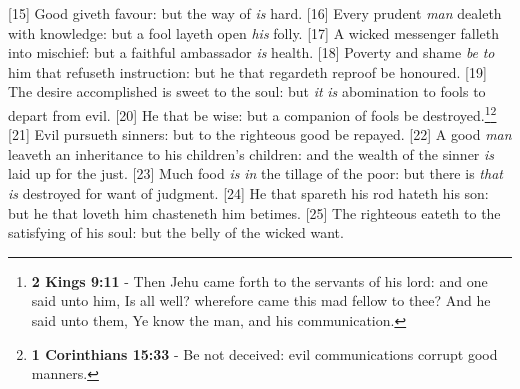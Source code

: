[15] \textcolor[cmyk]{0.99998,1,0,0}{Good  giveth favour: but the way of  \emph{is} hard.}
[16] \textcolor[cmyk]{0.99998,1,0,0}{Every prudent \emph{man} dealeth with knowledge: but a fool layeth open \emph{his} folly.}
[17] \textcolor[cmyk]{0.99998,1,0,0}{A wicked messenger falleth into mischief: but a faithful ambassador \emph{is} health.}
[18] \textcolor[cmyk]{0.99998,1,0,0}{Poverty and shame \emph{} \emph{be} \emph{to} him that refuseth instruction: but he that regardeth reproof  be honoured.}
[19] \textcolor[cmyk]{0.99998,1,0,0}{The desire accomplished is sweet to the soul: but \emph{it} \emph{is} abomination to fools to depart from evil.}
[20] \textcolor[cmyk]{0.99998,1,0,0}{He that   be wise: but a companion of fools  be destroyed.}\footnote{\textbf{2 Kings 9:11} - Then Jehu came forth to the servants of his lord: and one said unto him, Is all well? wherefore came this mad fellow to thee? And he said unto them, Ye know the man, and his communication.}\footnote{\textbf{1 Corinthians 15:33} - Be not deceived: evil communications corrupt good manners.}
[21] \textcolor[cmyk]{0.99998,1,0,0}{Evil pursueth sinners: but to the righteous good  be repayed.}
[22] \textcolor[cmyk]{0.99998,1,0,0}{A good \emph{man} leaveth an inheritance to his children's children: and the wealth of the sinner \emph{is} laid up for the just.}
[23] \textcolor[cmyk]{0.99998,1,0,0}{Much food \emph{is} \emph{in} the tillage of the poor: but there is \emph{that} \emph{is} destroyed for want of judgment.}
[24] \textcolor[cmyk]{0.99998,1,0,0}{He that spareth his rod hateth his son: but he that loveth him chasteneth him betimes.}
[25] \textcolor[cmyk]{0.99998,1,0,0}{The righteous eateth to the satisfying of his soul: but the belly of the wicked  want.}


